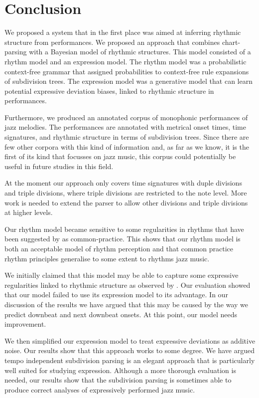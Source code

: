 \chapter{Conclusion}
\label{sec:conclusion}


We proposed a system that in the first place was aimed at inferring rhythmic structure from performances. We proposed an approach that combines chart-parsing with a Bayesian model of rhythmic structures. This model consisted of a rhythm model and an expression model. The rhythm model was a probabilistic context-free grammar that assigned probabilities to context-free rule expansions of subdivision trees. The expression model was a generative model that can learn potential expressive deviation biases, linked to rhythmic structure in performances.

Furthermore, we produced an annotated corpus of monophonic performances of jazz melodies. The performances are annotated with metrical onset times, time signatures, and rhythmic structure in terms of subdivision trees. Since there are few other corpora with this kind of information and, as far as we know, it is the first of its kind that focusses on jazz music, this corpus could potentially be useful in future studies in this field. 

At the moment our approach only covers time signatures with duple divisions and triple divisions, where triple divisions are restricted to the note level. More work is needed to extend the parser to allow other divisions and triple divisions at higher levels.

Our rhythm model became sensitive to some regularities in rhythms that have been suggested by \citet{temperley2010modeling} as common-practice. This shows that our rhythm model is both an acceptable model of rhythm perception and that common practice rhythm principles generalise to some extent to rhythms jazz music.

We initially claimed that this model may be able to capture some expressive regularities linked to rhythmic structure as observed by \citet{bengtsson1983analysis}. Our evaluation showed that our model failed to use its expression model to its advantage. In our discussion of the results we have argued that this may be caused by the way we predict downbeat and next downbeat onsets. At this point, our model needs improvement.

We then simplified our expression model to treat expressive deviations as additive noise. Our results show that this approach works to some degree. We have argued tempo independent subdivision parsing is an elegant approach that is particularly well suited for studying expression. Although a more thorough evaluation is needed, our results show that the subdivision parsing is sometimes able to produce correct analyses of expressively performed jazz music.